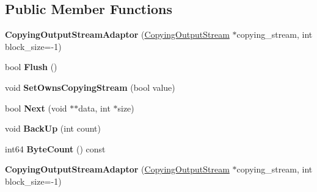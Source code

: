 \subsection*{Public Member Functions}
\begin{DoxyCompactItemize}
\item 
\mbox{\label{classgoogle_1_1protobuf_1_1io_1_1CopyingOutputStreamAdaptor_a1222b11cd379a6801515bb56ecc13d93}} 
{\bfseries Copying\+Output\+Stream\+Adaptor} (\hyperlink{classgoogle_1_1protobuf_1_1io_1_1CopyingOutputStream}{Copying\+Output\+Stream} $\ast$copying\+\_\+stream, int block\+\_\+size=-\/1)
\item 
\mbox{\label{classgoogle_1_1protobuf_1_1io_1_1CopyingOutputStreamAdaptor_ac6f943038f484de49ac38ade46b035df}} 
bool {\bfseries Flush} ()
\item 
\mbox{\label{classgoogle_1_1protobuf_1_1io_1_1CopyingOutputStreamAdaptor_a9fe05aae51c823c145d88ea02fa2cb0e}} 
void {\bfseries Set\+Owns\+Copying\+Stream} (bool value)
\item 
\mbox{\label{classgoogle_1_1protobuf_1_1io_1_1CopyingOutputStreamAdaptor_a1f8aa4b7be163e4ccb1f90be23204efb}} 
bool {\bfseries Next} (void $\ast$$\ast$data, int $\ast$size)
\item 
\mbox{\label{classgoogle_1_1protobuf_1_1io_1_1CopyingOutputStreamAdaptor_a73678fb5e32647ee0f6ffb89a597f46e}} 
void {\bfseries Back\+Up} (int count)
\item 
\mbox{\label{classgoogle_1_1protobuf_1_1io_1_1CopyingOutputStreamAdaptor_aa2ab56e15fe325947c273a2b5a5f6a01}} 
int64 {\bfseries Byte\+Count} () const
\item 
\mbox{\label{classgoogle_1_1protobuf_1_1io_1_1CopyingOutputStreamAdaptor_a1222b11cd379a6801515bb56ecc13d93}} 
{\bfseries Copying\+Output\+Stream\+Adaptor} (\hyperlink{classgoogle_1_1protobuf_1_1io_1_1CopyingOutputStream}{Copying\+Output\+Stream} $\ast$copying\+\_\+stream, int block\+\_\+size=-\/1)
$$
\end{DoxyCompactItemize}
